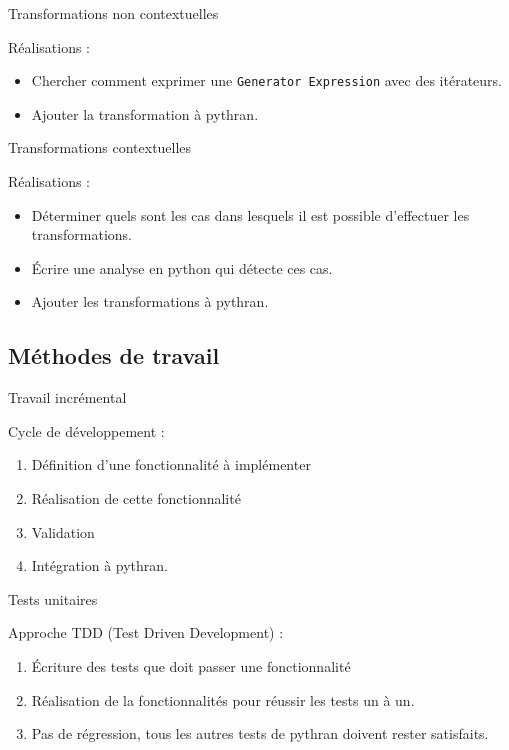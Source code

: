 \documentclass{beamer}
\begin{document}
\begin{frame}{Transformations non contextuelles}

  Réalisations :
  \begin{itemize}
    \item Chercher comment exprimer une \texttt{Generator Expression}
    avec des itérateurs.  
    \item Ajouter la transformation à  pythran.
  \end{itemize}

\end{frame}

\begin{frame}{Transformations contextuelles}

  Réalisations :
  \begin{itemize}
    \item Déterminer quels sont les cas dans lesquels il est
    possible d'effectuer les transformations.  
    \item Écrire une analyse en python qui détecte ces cas.  
    \item Ajouter les transformations à pythran.
  \end{itemize}

\end{frame}

\subsection{Méthodes de travail}

\begin{frame}{Travail incrémental}

  Cycle de développement :
  \begin{enumerate}
    \pause \item Définition d'une fonctionnalité à implémenter
    \pause \item Réalisation de cette fonctionnalité 
    \pause \item Validation 
    \pause \item Intégration à pythran.
  \end{enumerate}

\end{frame}

\begin{frame}{Tests unitaires}

  Approche TDD (Test Driven Development) :
  \begin{enumerate}
    \pause \item Écriture des tests que doit passer une fonctionnalité
    \pause \item Réalisation de la fonctionnalités pour réussir les
    tests un à un.  
    \pause \item Pas de régression, tous les autres tests 
    de pythran doivent rester satisfaits.
  \end{enumerate}

\end{frame}
\end{document}
